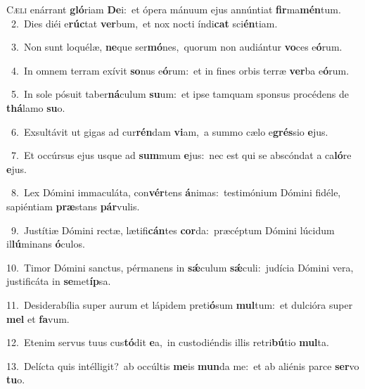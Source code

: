 \lettrine{\initial\textcolor{\initialcolor}{C}}{æli} enárrant \textbf{gló}\-riam \textbf{De}\-i:~\star et ópera mánuum ejus annúntiat \textbf{fir}\-ma\-\textbf{mén}\-tum.\\
{\numbfont\textcolor{\numbcolor}{~2.}}~Dies diéi e\-\textbf{rúc}\-tat \textbf{ver}\-bum,~\star et nox nocti índi\textbf{cat} sci\-\textbf{én}\-tiam.\par
{\numbfont\textcolor{\numbcolor}{~3.}}~Non sunt loquélæ, \textbf{ne}\-que ser\-\textbf{mó}\-nes,~\star quorum non audiántur \textbf{vo}\-ces e\-\textbf{ó}\-rum.\par
{\numbfont\textcolor{\numbcolor}{~4.}}~In omnem terram exívit \textbf{so}\-nus e\-\textbf{ó}\-rum:~\star et in fines orbis terræ \textbf{ver}\-ba e\-\textbf{ó}\-rum.\par
{\numbfont\textcolor{\numbcolor}{~5.}}~In sole pósuit taber\-\textbf{ná}\-culum \textbf{su}\-um:~\star et ipse tamquam sponsus procédens de \textbf{thá}\-lamo \textbf{su}\-o.\par
{\numbfont\textcolor{\numbcolor}{~6.}}~Exsultávit ut gigas ad cur\-\textbf{rén}\-dam \textbf{vi}\-am,~\star a summo cælo e\-\textbf{grés}\-sio \textbf{e}\-jus.\par
{\numbfont\textcolor{\numbcolor}{~7.}}~Et occúrsus ejus usque ad \textbf{sum}\-mum \textbf{e}\-jus:~\star nec est qui se abscóndat a ca\-\textbf{ló}\-re \textbf{e}\-jus.\par
{\numbfont\textcolor{\numbcolor}{~8.}}~Lex Dómini immaculáta, con\-\textbf{vér}\-tens \textbf{á}\-nimas:~\star testimónium Dómini fidéle, sapiéntiam \textbf{præ}\-stans \textbf{pár}\-vulis.\par
{\numbfont\textcolor{\numbcolor}{~9.}}~Justítiæ Dómini rectæ, lætifi\-\textbf{cán}\-tes \textbf{cor}\-da:~\star præcéptum Dómini lúcidum il\-\textbf{lú}\-minans \textbf{ó}\-culos.\par
{\numbfont\textcolor{\numbcolor}{10.}}~Timor Dómini sanctus, pérmanens in \textbf{sǽ}\-culum \textbf{sǽ}\-culi:~\star judícia Dómini vera, justificáta in \textbf{se}\-met\-\textbf{íp}\-sa.\par
{\numbfont\textcolor{\numbcolor}{11.}}~Desiderabília super aurum et lápidem preti\-\textbf{ó}\-sum \textbf{mul}\-tum:~\star et dulcióra super \textbf{mel} et \textbf{fa}\-vum.\par
{\numbfont\textcolor{\numbcolor}{12.}}~Etenim servus tuus cus\-\textbf{tó}\-dit \textbf{e}\-a,~\star in custodiéndis illis retri\-\textbf{bú}\-tio \textbf{mul}\-ta.\par
{\numbfont\textcolor{\numbcolor}{13.}}~Delícta quis intélligit?~\dagger ab occúltis \textbf{me}\-is \textbf{mun}\-da me:~\star et ab aliénis parce \textbf{ser}\-vo \textbf{tu}\-o.\par
